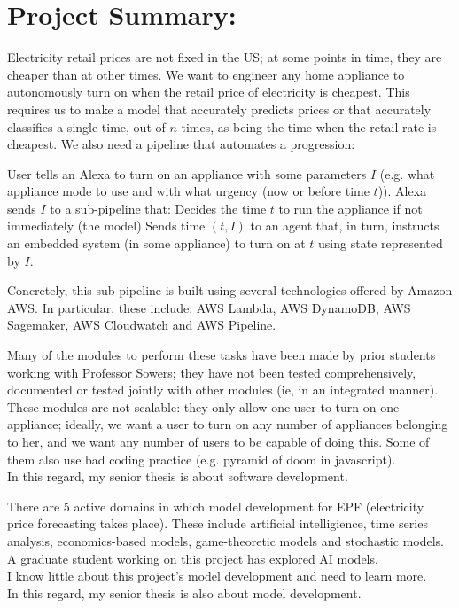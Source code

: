 \documentclass[a4paper]{article}
\begin{document}
\section{Project Summary:}

Electricity retail prices are not fixed in the US; at some points in time, they are cheaper than at other times. We want to engineer any home appliance to autonomously turn on when the retail price of electricity is cheapest. This requires us
to make a model that accurately predicts prices or that accurately classifies a single time, out of $n$ times, as being the time when
the retail rate is cheapest. We also need a pipeline that automates a progression:

\begin{outline}
    \1 User tells an Alexa to turn on an appliance with some parameters $I$ (e.g. what appliance mode to use and with what urgency (now or before time $t$)).
    \1 Alexa sends $I$ to a sub-pipeline that:
    \2 Decides the time $t$ to run the appliance if not immediately (the model)
    \2 Sends time $(t,I)$ to an agent that, in turn, instructs an embedded system (in some appliance) to turn on at $t$ using state represented by $I$.
\end{outline}

Concretely, this sub-pipeline is built using several technologies offered by Amazon AWS. In particular, these include: AWS Lambda, AWS DynamoDB, AWS Sagemaker,
AWS Cloudwatch and AWS Pipeline.

\begin{remark}
     Many of the modules to perform these tasks have been made by prior students working with Professor Sowers; they have not been tested comprehensively, documented
     or tested jointly with other modules (ie, in an integrated manner). These modules are not scalable: they only allow one user to turn on one appliance; ideally, we want a user to turn on any number of appliances belonging
     to her, and we want any number of users to be capable of doing this. Some of them also use bad coding practice (e.g. pyramid of doom in javascript). \\

     In this regard, my senior thesis is about software development.
\end{remark}

\begin{remark}
    There are 5 active domains in which model development for EPF (electricity price forecasting takes place). These include artificial intelligience, time series analysis, economics-based models,
    game-theoretic models and stochastic models. A graduate student working on this project has explored AI models. \\

    I know little about this project's model development and need to learn more. \\

    In this regard, my senior thesis is also about model development. \\
\end{remark}
\end{document}
